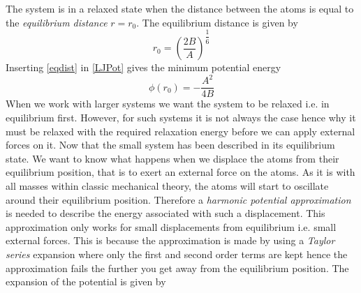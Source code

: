 The system is in a relaxed state when the distance between the atoms is equal to the \textit{equilibrium distance} $r=r_{0}$. The equilibrium distance is given by \begin{equation}
    r_{0}=\left(\dfrac{2B}{A}\right)^{\dfrac{1}{6}}\label{eqdist}
\end{equation} Inserting \eqref{eqdist} in \eqref{LJPot} gives the minimum potential energy \begin{equation}
    \phi(r_{0})=-\dfrac{A^{2}}{4B}
\end{equation}When we work with larger systems we want the system to be relaxed i.e. in equilibrium first. However, for such systems it is not always the case hence why it must be relaxed with the required relaxation energy before we can apply external forces on it. Now that the small system has been described in its equilibrium state. We want to know what happens when we displace the atoms from their equilibrium position, that is to exert an external force on the atoms. As it is with all masses within classic mechanical theory, the atoms will start to oscillate around their equilibrium position. Therefore a \textit{harmonic potential approximation} is needed to describe the energy associated with such a displacement. This approximation only works for small displacements from equilibrium i.e. small external forces. This is because the approximation is made by using a \textit{Taylor series} expansion where only the first and second order terms are kept hence the approximation fails the further you get away from the equilibrium position. The expansion of the potential is given by
